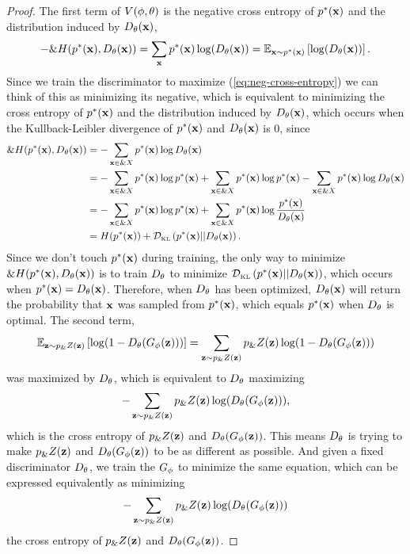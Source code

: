 \begin{proof}
  The first term of $V(\phi, \theta)$ is the negative cross entropy of $p^*(\mathbf{x})$ and
  the distribution induced by $D_\theta(\mathbf{x})$,
\begin{align}
  \label{eq:neg-cross-entropy}
  - \&H(\pt, \D(\*x)) = \sum_{\*x}\pt\log(\D(\*x)) = \mathbb{E}_{\*x \sim \pt} \left[\log(\D(\*x))\right].
\end{align}
Since we train the discriminator to maximize
(\ref{eq:neg-cross-entropy}) we can think of this as minimizing its
negative, which is equivalent to minimizing the cross entropy of $p^*(\mathbf{x})$
and the distribution induced by $D_\theta(\mathbf{x})$, which occurs when the
Kullback-Leibler divergence of $p^*(\mathbf{x})$ and $D_\theta(\mathbf{x})$ is 0, since
\begin{align}
  \&H(p^*(\mathbf{x}),D_\theta(\mathbf{x})) & = - \sum_{\mathbf{x} \in \&X} p^*(\mathbf{x}) \log D_\theta(\mathbf{x}) \\
                   & = -\sum_{\mathbf{x} \in \&X} p^*(\mathbf{x}) \log p^*(\mathbf{x}) + \sum_{\mathbf{x} \in \&X} p^*(\mathbf{x}) \log p^*(\mathbf{x}) - \sum_{\mathbf{x} \in \&X} p^*(\mathbf{x}) \log D_\theta(\mathbf{x}) \\
                   & = -\sum_{\mathbf{x} \in \&X} p^*(\mathbf{x}) \log p^*(\mathbf{x}) + \sum_{\mathbf{x} \in \&X} p^*(\mathbf{x}) \log {p^*(\mathbf{x})\over
                     D_\theta(\mathbf{x})}  \\
                   & = H(p^*(\mathbf{x})) + \mathcal{D}_{\text{\tiny KL}}\left( p^*(\mathbf{x}) \middle| \middle| D_\theta(\mathbf{x}) \right).
\end{align}
Since we don't touch $p^*(\mathbf{x})$ during training, the only way to minimize
$\&H(p^*(\mathbf{x}),D_\theta(\mathbf{x}))$ is to train $D_\theta$ to minimize $\mathcal{D}_{\text{\tiny KL}}\left( p^*(\mathbf{x}) \middle| \middle| D_\theta(\mathbf{x}) \right)$,
which occurs when $p^*(\mathbf{x}) = D_\theta(\mathbf{x})$. Therefore, when $D_\theta$ has been
optimized, $D_\theta(\mathbf{x})$ will return the probability that $\mathbf{x}$ was
sampled from $p^*(\mathbf{x})$, which equals $p^*(\mathbf{x})$ when $D_\theta$ is optimal. The
second term,
\begin{align}
  \mathbb{E}_{\mathbf{z} \sim p_\&Z(\mathbf{z})}\left[\log(1 - D_\theta(G_\phi(\mathbf{z})))\right] =
  \sum_{\mathbf{z} \sim p_\&Z(\mathbf{z})} p_\&Z(\mathbf{z}) \log (1 - D_\theta(G_\phi(\mathbf{z})))
\end{align}
was maximized by $D_\theta$, which is equivalent to $D_\theta$ maximizing
\begin{align}
  -\sum_{\mathbf{z} \sim p_\&Z(\mathbf{z})} p_\&Z(\mathbf{z}) \log (D_\theta(G_\phi(\mathbf{z}))),
\end{align}
which is the cross entropy of $p_\&Z(\mathbf{z})$ and $D_\theta(G_\phi(\mathbf{z}))$. This means $D_\theta$ is trying
to make $p_\&Z(\mathbf{z})$ and $D_\theta(G_\phi(\mathbf{z}))$ to be as different as possible. And given a
fixed discriminator $D_\theta$, we train the $G_\phi$ to minimize the same equation, which
can be expressed equivalently as minimizing
\begin{align}
  -\sum_{\mathbf{z} \sim p_\&Z(\mathbf{z})} p_\&Z(\mathbf{z}) \log (D_\theta(G_\phi(\mathbf{z})))
\end{align}
the cross entropy of $p_\&Z(\mathbf{z})$ and $D_\theta(G_\phi(\mathbf{z}))$.
\end{proof}

